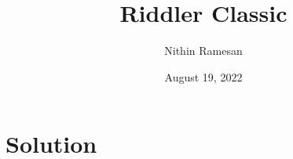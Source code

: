 \documentclass[11pt]{article}
\title{Riddler Classic}
\date{August 19, 2022}
\author{Nithin Ramesan}
\theoremstyle{definition}
\begin{document}
	\maketitle
	\section{Solution}
\end{document}
